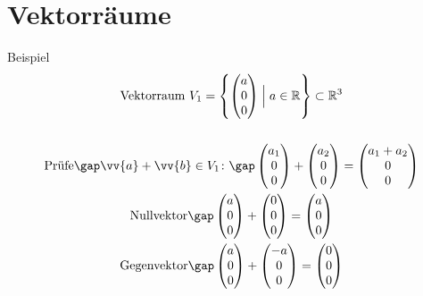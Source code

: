 \section{Vektorräume}
Beispiel
\begin{gather*}
  \text{Vektorraum } V_1 = \left\{\begin{pmatrix}a \\ 0 \\ 0\end{pmatrix} \Bigm| a \in \mathbb{R}\right\} \subset \mathbb{R}^3 \\\\
  \text{Prüfe}\gap \vv{a} + \vv{b} \in V_1 \colon \gap \begin{pmatrix}a_1 \\ 0 \\ 0\end{pmatrix} + \begin{pmatrix}a_2 \\ 0 \\ 0\end{pmatrix} = \begin{pmatrix}a_1 + a_2 \\ 0 \\ 0\end{pmatrix} \\
  \text{Nullvektor}\gap \begin{pmatrix}a \\ 0 \\ 0\end{pmatrix} + \begin{pmatrix}0 \\ 0 \\ 0\end{pmatrix} = \begin{pmatrix}a \\ 0 \\ 0\end{pmatrix} \\
  \text{Gegenvektor}\gap \begin{pmatrix}a \\ 0 \\ 0\end{pmatrix} + \begin{pmatrix}-a \\ 0 \\ 0\end{pmatrix} = \begin{pmatrix}0 \\ 0 \\ 0\end{pmatrix} \\

\end{gather*}
